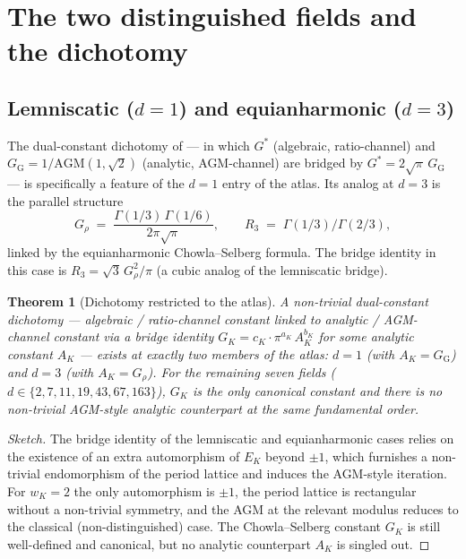 \documentclass[11pt]{amsart}
\theoremstyle{plain}
\newtheorem{theorem}{Theorem}[section]
\theoremstyle{definition}
\theoremstyle{remark}
\newcommand{\Gs}{G^{*}}
\newcommand{\GG}{G_{\!\scriptscriptstyle\mathrm{G}}}
\newcommand{\GK}{G_{K}}
\begin{document}
\section{The two distinguished fields and the dichotomy}\label{sec:dichotomy}

\subsection{Lemniscatic ($d = 1$) and equianharmonic ($d = 3$)}

The dual-constant dichotomy of \cite{paper-gstar-A} --- in which $\Gs$
(algebraic, ratio-channel) and $\GG = 1/\mathrm{AGM}(1, \sqrt{2})$
(analytic, AGM-channel) are bridged by $\Gs = 2\sqrt{\pi}\,\GG$ --- is
specifically a feature of the $d = 1$ entry of the atlas. Its analog at
$d = 3$ is the parallel structure
\[
G_{\rho} \;=\; \frac{\Gamma(1/3)\,\Gamma(1/6)}{2\pi\sqrt{\pi}}, \qquad
R_{3} \;=\; \Gamma(1/3)/\Gamma(2/3),
\]
linked by the equianharmonic Chowla--Selberg formula. The bridge identity
in this case is $R_{3} = \sqrt{3}\,G_{\rho}^{2}/\pi$ (a cubic analog of
the lemniscatic bridge).

\begin{theorem}[Dichotomy restricted to the atlas]\label{thm:dichotomy-atlas}
A non-trivial dual-constant dichotomy --- algebraic / ratio-channel
constant linked to analytic / AGM-channel constant via a bridge identity
$\GK = c_K \cdot \pi^{a_K}\, A_{K}^{b_K}$ for some analytic constant
$A_K$ --- exists at exactly two members of the atlas: $d = 1$ (with
$A_K = \GG$) and $d = 3$ (with $A_K = G_{\rho}$). For the remaining seven
fields ($d \in \{2, 7, 11, 19, 43, 67, 163\}$), $\GK$ is the only canonical
constant and there is no non-trivial AGM-style analytic counterpart at
the same fundamental order.
\end{theorem}

\begin{proof}[Sketch]
The bridge identity of the lemniscatic and equianharmonic cases relies on
the existence of an extra automorphism of $E_K$ beyond $\pm 1$, which
furnishes a non-trivial endomorphism of the period lattice and induces
the AGM-style iteration. For $w_K = 2$ the only automorphism is $\pm 1$,
the period lattice is rectangular without a non-trivial symmetry, and the
AGM at the relevant modulus reduces to the classical (non-distinguished)
case. The Chowla--Selberg constant $\GK$ is still well-defined and
canonical, but no analytic counterpart $A_K$ is singled out.
\end{proof}
\end{document}
